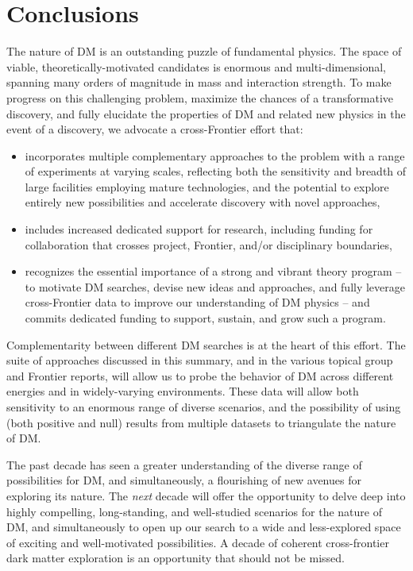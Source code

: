 \documentclass[nofootinbib]{article}
\begin{document}
\section{Conclusions}

The nature of DM is an outstanding puzzle of fundamental physics. The space of viable, theoretically-motivated candidates is enormous and multi-dimensional, spanning many orders of magnitude in mass and interaction strength. To make progress on this challenging problem, maximize the chances of a transformative discovery, and fully elucidate the properties of DM and related new physics in the event of a discovery, we advocate a cross-Frontier effort that:
\begin{itemize}
\item incorporates multiple complementary approaches to the problem with a range of experiments at varying scales, reflecting both the sensitivity and breadth of large facilities employing mature technologies, and the potential to explore entirely new possibilities and accelerate discovery with novel approaches, 
\item includes increased dedicated support for research, including funding for collaboration that crosses project, Frontier, and/or disciplinary boundaries,
\item recognizes the essential importance of a strong and vibrant theory program -- to motivate DM searches, devise new ideas and approaches, and fully leverage cross-Frontier data to improve our understanding of DM physics -- and commits dedicated funding to support, sustain, and grow such a program. 
\end{itemize}

Complementarity between different DM searches is at the heart of this effort. The suite of approaches discussed in this summary, and in the various topical group and Frontier reports, will allow us to probe the behavior of DM across different energies and in widely-varying environments. These data will allow both sensitivity to an enormous range of diverse scenarios, and the possibility of using (both positive and null) results from multiple datasets to triangulate the nature of DM.

The past decade has seen a greater understanding of the diverse range of possibilities for DM, and simultaneously, a flourishing of new avenues for exploring its nature. The {\it next} decade will offer the opportunity to delve deep into highly compelling, long-standing, and well-studied scenarios for the nature of DM, and simultaneously to open up our search to a wide and less-explored space of exciting and well-motivated possibilities. A decade of coherent cross-frontier dark matter exploration is an opportunity that should not be missed.
\end{document}
